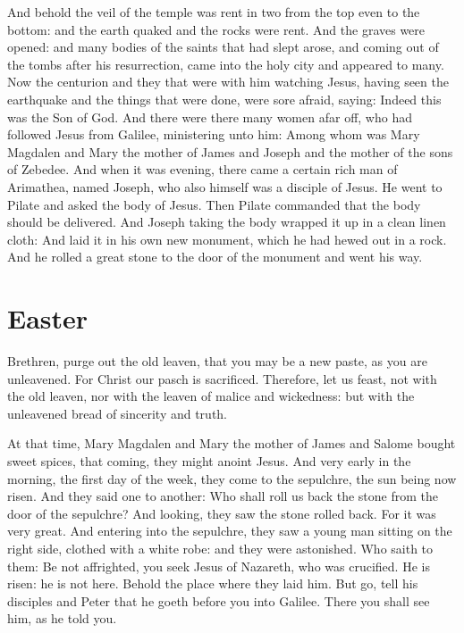 \begin{multicols}{2}
And behold the veil of the temple was rent in two from the top even to the
bottom: and the earth quaked and the rocks were rent.  And the graves were
opened: and many bodies of the saints that had slept arose, and coming out of
the tombs after his resurrection, came into the holy city and appeared to many.
Now the centurion and they that were with him watching Jesus, having seen the
earthquake and the things that were done, were sore afraid, saying: Indeed this
was the Son of God.  And there were there many women afar off, who had followed
Jesus from Galilee, ministering unto him: Among whom was Mary Magdalen and Mary
the mother of James and Joseph and the mother of the sons of Zebedee.  And when
it was evening, there came a certain rich man of Arimathea, named Joseph, who
also himself was a disciple of Jesus.  He went to Pilate and asked the body of
Jesus. Then Pilate commanded that the body should be delivered.  And Joseph
taking the body wrapped it up in a clean linen cloth: And laid it in his own
new monument, which he had hewed out in a rock. And he rolled a great stone to
the door of the monument and went his way.

\section{Easter}



Brethren, purge out the old leaven, that you may be a new paste, as you are unleavened.
For Christ our pasch is sacrificed.  Therefore, let us feast, not with the old
leaven, nor with the leaven of malice and wickedness: but with the unleavened
bread of sincerity and truth.



At that time, %
Mary Magdalen and Mary the mother of James and
Salome bought sweet spices, that coming, they might anoint Jesus.  And very
early in the morning, the first day of the week, they come to the sepulchre,
the sun being now risen.   And they
said one to another: Who shall roll us back the stone from the door of the
sepulchre?  And looking, they saw the stone rolled back. For it was very great.
And entering into the sepulchre, they saw a young man sitting on the right
side, clothed with a white robe: and they were astonished.  Who saith to them:
Be not affrighted, you seek Jesus of Nazareth, who was crucified. He is risen:
he is not here.  Behold the place where they laid him.  But go, tell his
disciples and Peter that he goeth before you into Galilee. There you shall see
him, as he told you.



\end{multicols}
